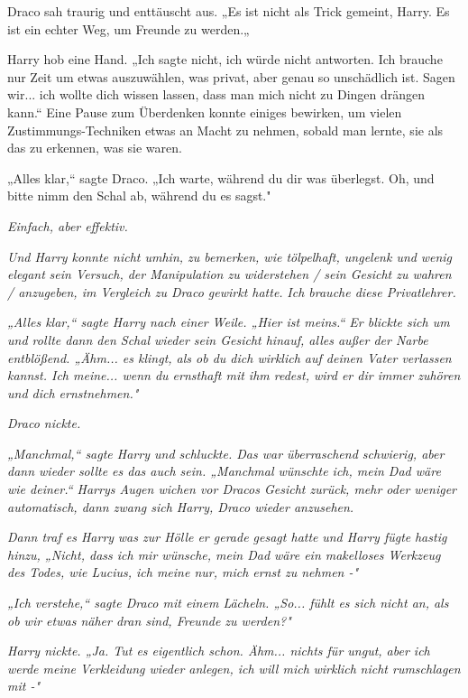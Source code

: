 {Draco sah traurig und enttäuscht aus. „Es ist nicht als Trick gemeint, Harry. Es ist ein echter Weg, um Freunde zu werden.„

Harry hob eine Hand. „Ich sagte nicht, ich würde nicht antworten. Ich brauche nur Zeit um etwas auszuwählen, was privat, aber genau so unschädlich ist. Sagen wir... ich wollte dich wissen lassen, dass man mich nicht zu Dingen drängen kann.“ Eine Pause zum Überdenken konnte einiges bewirken, um vielen Zustimmungs-Techniken etwas an Macht zu nehmen, sobald man lernte, sie als das zu erkennen, was sie waren.

„Alles klar,“ sagte Draco. „Ich warte, während du dir was überlegst. Oh, und bitte nimm den Schal ab, während du es sagst."

\emph{Einfach, aber effektiv.}

\emph{Und Harry konnte nicht umhin, zu bemerken, wie tölpelhaft, ungelenk und} \emph{wenig elegant} \emph{sein Versuch, der Manipulation zu widerstehen / sein Gesicht zu wahren / anzugeben, im Vergleich zu Draco gewirkt hatte.} \emph{\emph{Ich brauche diese Privatlehrer.}}

\emph{„Alles klar,“ sagte Harry nach einer Weile. „Hier ist meins.“ Er blickte sich um und rollte dann den Schal wieder sein Gesicht hinauf, alles außer der Narbe entblößend. „Ähm... es klingt, als ob du dich wirklich auf deinen Vater verlassen kannst. Ich meine... wenn du ernsthaft mit ihm redest, wird er dir immer zuhören und dich ernstnehmen."}

\emph{Draco nickte.}

\emph{„Manchmal,“ sagte Harry und schluckte. Das war überraschend schwierig, aber dann wieder sollte es das auch sein. „Manchmal wünschte ich, mein Dad wäre wie deiner.“ Harrys Augen wichen vor Dracos Gesicht zurück, mehr oder weniger automatisch, dann zwang sich Harry, Draco wieder anzusehen.}

\emph{Dann traf es Harry} \emph{\emph{was zur Hölle er gerade gesagt hatte}} \emph{und Harry fügte} \emph{hastig hinzu, „Nicht, dass ich mir wünsche, mein Dad wäre ein makelloses Werkzeug des Todes, wie Lucius, ich meine nur, mich ernst zu nehmen -"}

\emph{„Ich verstehe,“ sagte Draco mit einem Lächeln. „So... fühlt es sich nicht an, als ob wir etwas näher dran sind, Freunde zu werden?"}

\emph{Harry nickte. „Ja. Tut es eigentlich schon. Ähm... nichts für ungut, aber ich werde meine Verkleidung wieder anlegen, ich will mich} \emph{\emph{wirklich}} \emph{nicht rumschlagen mit -"}

}
